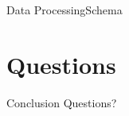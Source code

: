 \documentclass{beamer}
\begin{document}
\begin{frame}{Data Processing}{Schema}
    \begin{center}
    \end{center}
\end{frame}

\section{Questions}

\begin{frame}{Conclusion}
    \huge{Questions?}
\end{frame}
\end{document}
